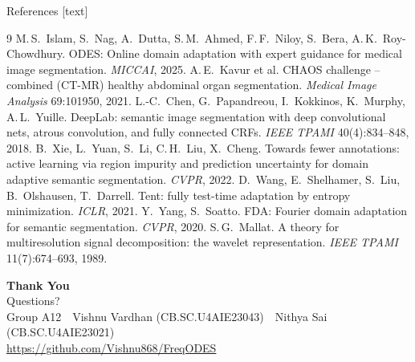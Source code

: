 \documentclass[aspectratio=169,10pt]{beamer}
\newcommand{\GroupName}{Group A12}
\newcommand{\MemberA}{Vishnu Vardhan (CB.SC.U4AIE23043)}
\newcommand{\MemberB}{Nithya Sai (CB.SC.U4AIE23021)}
\begin{document}
\begin{frame}{References}
    \small
    [text]
    \begin{thebibliography}{9}
       M.\,S.~Islam, S.~Nag, A.~Dutta, S.\,M.~Ahmed, F.\,F.~Niloy, S.~Bera, A.\,K.~Roy-Chowdhury. ODES: Online domain adaptation with expert guidance for medical image segmentation. \emph{MICCAI}, 2025.
       A.\,E.~Kavur et al. CHAOS challenge -- combined (CT-MR) healthy abdominal organ segmentation. \emph{Medical Image Analysis} 69:101950, 2021.
       L.-C.~Chen, G.~Papandreou, I.~Kokkinos, K.~Murphy, A.\,L.~Yuille. DeepLab: semantic image segmentation with deep convolutional nets, atrous convolution, and fully connected CRFs. \emph{IEEE TPAMI} 40(4):834--848, 2018.
       B.~Xie, L.~Yuan, S.~Li, C.\,H.~Liu, X.~Cheng. Towards fewer annotations: active learning via region impurity and prediction uncertainty for domain adaptive semantic segmentation. \emph{CVPR}, 2022.
       D.~Wang, E.~Shelhamer, S.~Liu, B.~Olshausen, T.~Darrell. Tent: fully test-time adaptation by entropy minimization. \emph{ICLR}, 2021.
       Y.~Yang, S.~Soatto. FDA: Fourier domain adaptation for semantic segmentation. \emph{CVPR}, 2020.
       S.\,G.~Mallat. A theory for multiresolution signal decomposition: the wavelet representation. \emph{IEEE TPAMI} 11(7):674--693, 1989.
    \end{thebibliography}
\end{frame}

\begin{frame}[plain]
  \centering
  \vfill
  {\fontsize{54}{60}\selectfont\bfseries\color{red!60!black} Thank You}\\[8mm]
  {\Large Questions?}\\[10mm]
  {\small \GroupName\ \textbullet\ \MemberA\ \textbullet\ \MemberB}\\[2mm]
  {\footnotesize \url{https://github.com/Vishnu868/FreqODES}}
  \vfill
\end{frame}
\end{document}
